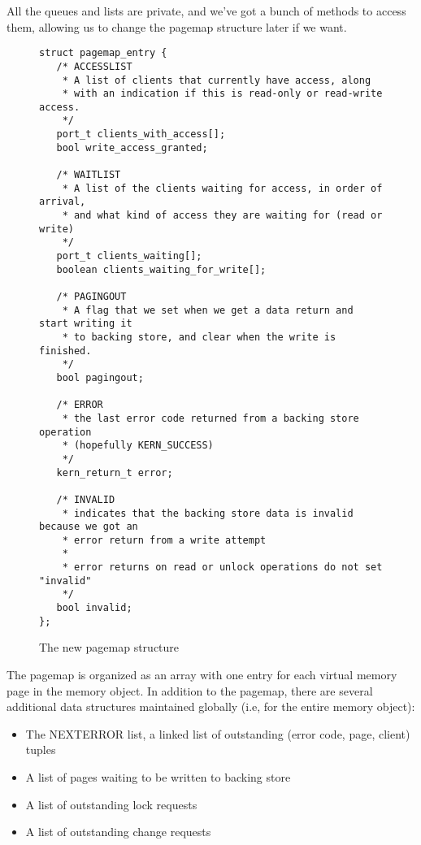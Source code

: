 \documentclass{article}
\begin{document}
All the queues and lists are private, and we've got a bunch of methods
to access them, allowing us to change the pagemap structure later if
we want.

\begin{figure}[h]
\begin{mdframed}[backgroundcolor=lightblue]
\begin{verbatim}
struct pagemap_entry {
   /* ACCESSLIST
    * A list of clients that currently have access, along
    * with an indication if this is read-only or read-write access.
    */
   port_t clients_with_access[];
   bool write_access_granted;

   /* WAITLIST
    * A list of the clients waiting for access, in order of arrival,
    * and what kind of access they are waiting for (read or write)
    */
   port_t clients_waiting[];
   boolean clients_waiting_for_write[];

   /* PAGINGOUT
    * A flag that we set when we get a data return and start writing it
    * to backing store, and clear when the write is finished.
    */
   bool pagingout;

   /* ERROR
    * the last error code returned from a backing store operation
    * (hopefully KERN_SUCCESS)
    */
   kern_return_t error;

   /* INVALID
    * indicates that the backing store data is invalid because we got an
    * error return from a write attempt
    *
    * error returns on read or unlock operations do not set "invalid"
    */
   bool invalid;
};
\end{verbatim}
\end{mdframed}
\caption{The new pagemap structure}
\end{figure}

The pagemap is organized as an array with one entry for each virtual
memory page in the memory object.  In addition to the pagemap, there
are several additional data structures maintained globally (i.e, for
the entire memory object):

\begin{itemize}[noitemsep]
\item The NEXTERROR list, a linked list of outstanding (error code, page, client) tuples
\item A list of pages waiting to be written to backing store
\item A list of outstanding lock requests
\item A list of outstanding change requests
\end{itemize}
\end{document}
